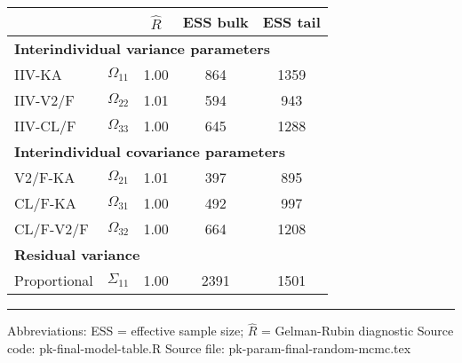 \setlength{\tabcolsep}{5pt} 
\begin{threeparttable}
\renewcommand{\arraystretch}{1.3}
\begin{tabular}[h]{lcccc}
\hline
 &  & $\hat{R}$ & ESS bulk & ESS tail \\
\hline
\multicolumn{5}{l}{\textbf{Interindividual variance parameters}}\\%
IIV-KA & $\Omega_{11}$ & 1.00 & 864 & 1359 \\
IIV-V2/F & $\Omega_{22}$ & 1.01 & 594 & 943 \\
IIV-CL/F & $\Omega_{33}$ & 1.00 & 645 & 1288 \\
\hline \multicolumn{5}{l}{\textbf{Interindividual covariance parameters}}\\%
V2/F-KA & $\Omega_{21}$ & 1.01 & 397 & 895 \\
CL/F-KA & $\Omega_{31}$ & 1.00 & 492 & 997 \\
CL/F-V2/F & $\Omega_{32}$ & 1.00 & 664 & 1208 \\
\hline \multicolumn{5}{l}{\textbf{Residual variance}}\\%
Proportional & $\Sigma_{11}$ & 1.00 & 2391 & 1501 \\
\hline
\end{tabular}
\end{threeparttable}
 
\vspace{0.67cm}
 
\begin{minipage}{1\linewidth}
\linespread{1.1}\selectfont
\rule{1\linewidth}{0.4pt}
\vspace{0.02cm}
Abbreviations: 
  ESS = effective sample size;
  $\hat{R}$ = Gelman-Rubin diagnostic \newline
Source code: pk-final-model-table.R \newline
Source file: pk-param-final-random-mcmc.tex \newline
\end{minipage}
